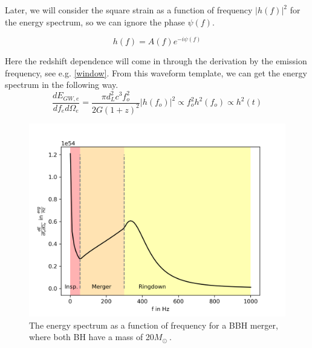 Later, we will consider the square strain as a function of frequency $|h(f)|^2$ for the energy spectrum, so we can ignore the phase $\psi(f)$.

\begin{equation}
    h(f)=A(f)e^{-i\psi(f)}
\end{equation}

Here the redshift dependence will come in through the derivation by the emission 
frequency, see e.g. \ref{window}. From this waveform template, we can get the energy 
spectrum in the following way.
\begin{equation}
    \frac{dE_{GW,e}}{df_e d\Omega_e} = \frac{\pi d_L^2 c^3f_o^2}{2G(1+z)^2} | h(f_o)| ^2 \propto f_o^2h^2(f_o) \propto h^2(t)
\end{equation}

\begin{figure}
    \centering
    \includegraphics[width=1\linewidth]{Images/dE_df_of_f.png}
    \caption{The energy spectrum as a function of frequency for a BBH merger, where both BH have a mass of 20$M_\odot\ $. }
    \label{dE_df_f}
\end{figure} 

